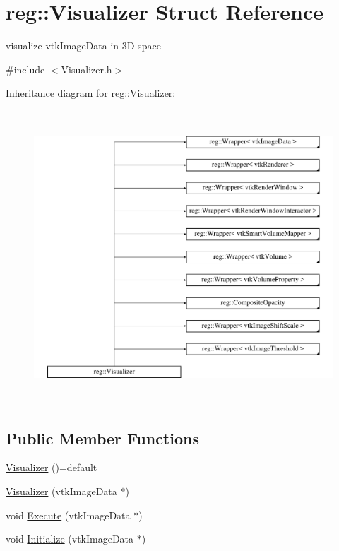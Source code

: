 \hypertarget{structreg_1_1_visualizer}{}\section{reg\+:\+:Visualizer Struct Reference}
\label{structreg_1_1_visualizer}


visualize vtk\+Image\+Data in 3D space  




{\ttfamily \#include $<$Visualizer.\+h$>$}

Inheritance diagram for reg\+:\+:Visualizer\+:\begin{figure}[H]
\begin{center}
\leavevmode
\includegraphics[height=11.000000cm]{structreg_1_1_visualizer}
\end{center}
\end{figure}
\subsection*{Public Member Functions}
\begin{DoxyCompactItemize}
\item 
\hyperlink{structreg_1_1_visualizer_a7b2aa4228668fdd9e9c174fc060d2fb9}{Visualizer} ()=default
\item 
\hyperlink{structreg_1_1_visualizer_a0746fc30028f0293bedd23468dae4d43}{Visualizer} (vtk\+Image\+Data $\ast$)
\item 
void \hyperlink{structreg_1_1_visualizer_aad11952fc8c47d0f208620a690ce4985}{Execute} (vtk\+Image\+Data $\ast$)
\item 
void \hyperlink{structreg_1_1_visualizer_a43f723595f4d7c1043cc13997aa9046b}{Initialize} (vtk\+Image\+Data $\ast$)
\end{DoxyCompactItemize}


